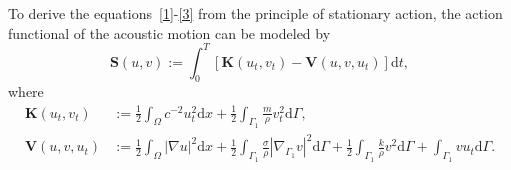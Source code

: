\documentclass[10pt]{elsarticle}
\begin{document}
To derive the equations~\eqref{1}-\eqref{3} from the principle of stationary action, the action functional of the acoustic motion can be modeled by 
\begin{equation*}
\mathbf{S}(u, v) :=\int_{0}^{T}\left[\mathbf{K}(u_t, v_t) - \mathbf{V}(u, v, u_t)\right] \mathrm{d}t, 
\end{equation*}
where
\begin{equation*}
\begin{split}
 \mathbf{K}(u_t, v_t)&:= \frac{1}{2}\int_{\Omega}c^{-2}u_t^2\mathrm{ d}x + \frac{1}{2}\int_{\Gamma_1}\frac{m}{\rho}v_t^2 \mathrm{d}\Gamma, \\
\mathbf{V}(u, v, u_t)&:=\frac{1}{2}\int_{\Omega}|\nabla u|^2 \mathrm{d}x + \frac{1}{2}\int_{\Gamma_1}\frac{\sigma}{\rho}|\nabla_{\Gamma_1}v|^2 \mathrm{d}\Gamma + \frac{1}{2}\int_{\Gamma_1}\frac{k}{\rho}v^2\mathrm{ d}\Gamma + \int_{\Gamma_1}vu_t \mathrm{d}\Gamma.
\end{split}
\end{equation*}
\end{document}
